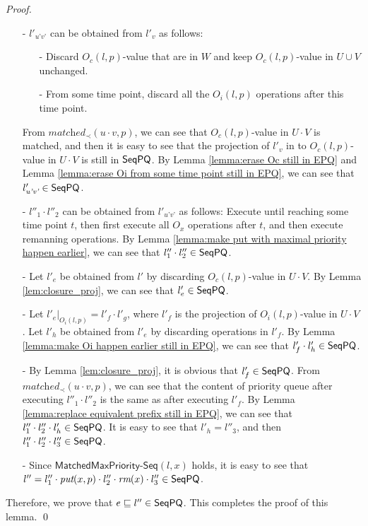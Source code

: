 \begin {proof}
\begin{itemize}
\item[-] $l'_{\textit{u'v'}}$ can be obtained from $l'_v$ as follows:
    \begin{itemize}
    \setlength{\itemsep}{0.5pt}
    \item[-] Discard $O_c(l,p)$-value that are in $W$ and keep $O_c(l,p)$-value in $U \cup V$ unchanged.

    \item[-] From some time point, discard all the $O_i(l,p)$ operations after this time point.
    \end{itemize}

From $\textit{matched}_{\prec}(u \cdot v,p)$, we can see that $O_c(l,p)$-value in $U \cdot V$ is matched, and then it is easy to see that the projection of $l'_v$ in to $O_c(l,p)$-value in $U \cdot V$ is still in $\mathsf{SeqPQ}$. By Lemma \ref{lemma:erase Oc still in EPQ} and Lemma \ref{lemma:erase Oi from some time point still in EPQ}, we can see that $l'_{\textit{u'v'}} \in \mathsf{SeqPQ}$.

\item[-] $l''_1 \cdot l''_2$ can be obtained from $l'_{\textit{u'v'}}$ as follows: Execute until reaching some time point $t$, then first execute all $O_x$ operations after $t$, and then execute remanning operations. By Lemma \ref{lemma:make put with maximal priority happen earlier}, we can see that $l''_1 \cdot l''_2 \in \mathsf{SeqPQ}$.

\item[-] Let $l'_e$ be obtained from $l'$ by discarding $O_c(l,p)$-value in $U \cdot V$. By Lemma \ref{lem:closure_proj}, we can see that $l'_e \in \mathsf{SeqPQ}$.

\item[-] Let $l'_e \vert_{O_i(l,p)}  = l'_f \cdot l'_g$, where $l'_f$ is the projection of $O_i(l,p)$-value in $U \cdot V$. Let $l'_h$ be obtained from $l'_e$ by discarding operations in $l'_f$. By Lemma \ref{lemma:make Oi happen earlier still in EPQ}, we can see that $l'_f \cdot l'_h \in \mathsf{SeqPQ}$.


\item[-] By Lemma \ref{lem:closure_proj}, it is obvious that $l'_f \in \mathsf{SeqPQ}$. From $\textit{matched}_{\prec}(u \cdot v,p)$, we can see that the content of priority queue after executing $l''_1 \cdot l''_2$ is the same as after executing $l'_f$. By Lemma \ref{lemma:replace equivalent prefix still in EPQ}, we can see that $l''_1 \cdot l''_2 \cdot l'_h \in \mathsf{SeqPQ}$. It is easy to see that $l'_h = l''_3$, and then $l''_1 \cdot l''_2 \cdot l''_3 \in \mathsf{SeqPQ}$.

\item[-] Since $\mathsf{MatchedMaxPriority\text{-}Seq}(l,x)$ holds, it is easy to see that $l'' = l''_1 \cdot \textit{put}(x,p) \cdot l''_2 \cdot \textit{rm}(x) \cdot l''_3 \in \mathsf{SeqPQ}$.
\end{itemize}

Therefore, we prove that $e \sqsubseteq l'' \in \mathsf{SeqPQ}$. This completes the proof of this lemma. \qed
\end {proof}


